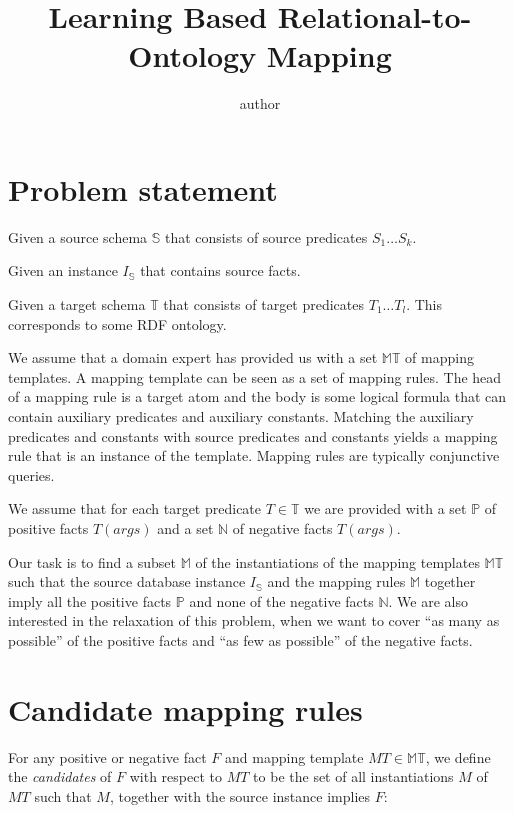 \documentclass{easychair}
\title{Learning Based Relational-to-Ontology Mapping}
\begin{document}
\author{
  author
}



\maketitle

\section{Problem statement}

Given a source schema $\mathbb{S}$ that consists of source predicates $S_1 \dots S_k$.

Given an instance $I_{\mathbb{S}}$ that contains source facts.

Given a target schema $\mathbb{T}$ that consists of target predicates
$T_1 \dots T_l$. This corresponds to some RDF ontology. 

We assume that a domain expert has provided us with a set $\mathbb{MT}$
of mapping templates. A mapping template can be seen as a set of
mapping rules.  The head of a mapping rule is a target atom and the
body is some logical formula that can contain auxiliary predicates and
auxiliary constants. Matching the auxiliary predicates and constants
with source predicates and constants yields a mapping rule that is an
instance of the template. Mapping rules are typically conjunctive queries.

We assume that for each target predicate $T \in \mathbb{T}$ we are
provided with a set $\mathbb{P}$ of positive facts $T(args)$ and a set
$\mathbb{N}$ of negative facts $T(args)$.

Our task is to find a subset $\mathbb{M}$ of the instantiations of the mapping
templates $\mathbb{MT}$ such that the source database instance $I_{\mathbb{S}}$ and the mapping
rules $\mathbb{M}$ together imply all the positive facts $\mathbb{P}$ and none
of the negative facts $\mathbb{N}$. We are also interested in the
relaxation of this problem, when we want to cover ``as many as
possible'' of the positive facts and ``as few as possible'' of the
negative facts.

\section{Candidate mapping rules}
For any positive or negative fact $F$ and mapping template $MT \in
\mathbb{MT}$, we define the \emph{candidates} of $F$ with respect to
$MT$ to be the set of all instantiations $M$ of $MT$ such that $M$,
together with the source instance implies $F$:
\end{document}
